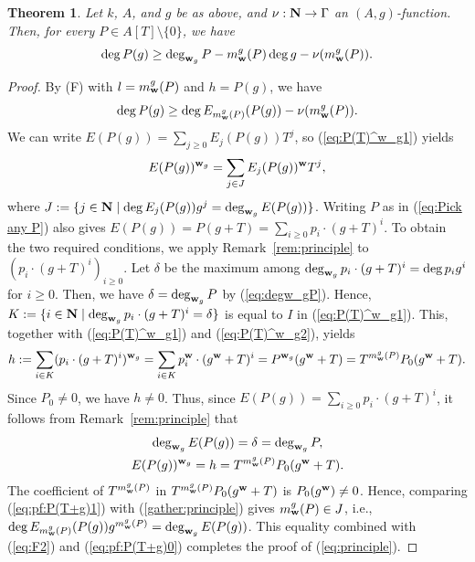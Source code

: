 \documentclass{amsart}
\theoremstyle{plain}
\newtheorem{thm}{Theorem}[section]
\theoremstyle{definition}
\newcommand{\zs}{\{ 0\} }
\newcommand{\sm}{\setminus}
\newcommand{\N}{{\bf N}}
\newcommand{\w}{{\bf w}}
\newcommand{\degw  }{\deg}
\begin{document}
\begin{thm}\label{thm:fundamental}
Let $k$, $A$, and $g$ be as above, 
and $\nu :\N \to \Gamma $ an $(A,g)$-function. 
Then, for every $P\in A[T]\sm \zs $, 
we have 
\begin{equation}\label{eq:principle}
\degw P(g)\ge \deg _{\w _g}P-m_{\w }^g(P)\degw g-\nu (m_{\w }^g(P)).
\end{equation}
\end{thm}
\begin{proof}
By (F) with $l=m_{\w }^g(P)$ and $h=P(g)$, 
we have 
\begin{equation}\label{eq:F2}
\degw P(g)\ge \degw E_{m_{\w }^g(P)}(P(g))-\nu (m_{\w }^g(P)). 
\end{equation}
We can write $E(P(g))=\sum _{j\ge 0}E_j(P(g))T^j$, 
so (\ref{eq:P(T)^w_g1}) yields 
\begin{equation}\label{gather:principle}
E(P(g))^{\w _g}=\sum _{j\in J}E_j(P(g))^{\w }T^j, 
\end{equation}
where $J:=\{ j\in \N \mid \degw E_j(P(g))g^j=\deg _{\w _g}E(P(g))\} $. 
Writing $P$ as in (\ref{eq:Pick any P}) also gives 
$E(P(g))=P(g+T)=\sum _{i\ge 0}p_i\cdot (g+T)^i$. 
To obtain the two required conditions, 
we apply Remark~\ref{rem:principle} to $(p_i\cdot (g+T)^i)_{i\ge 0}$. 
Let $\delta $ be the maximum among 
$\deg _{\w _g}p_i\cdot (g+T)^i=\degw p_ig^i$ for $i\ge 0$. 
Then, we have $\delta =\deg _{\w _g}P$ by (\ref{eq:degw_gP}). 
Hence, 
$K:=\{ i\in \N \mid \deg _{\w _g}p_i\cdot (g+T)^i=\delta \} $ 
is equal to $I$ in (\ref{eq:P(T)^w_g1}). 
This, 
together with (\ref{eq:P(T)^w_g1}) and (\ref{eq:P(T)^w_g2}), 
yields 
$$
h:=\sum _{i\in K}(p_i\cdot (g+T)^i)^{\w _g}
=\sum _{i\in K}p_i^{\w }\cdot (g^{\w }+T)^i
=P^{\w _g}(g^{\w }+T)=T^{m_{\w }^g(P)}P_0(g^{\w }+T). 
$$
Since $P_0\ne 0$, we have $h\ne 0$. 
Thus, 
since $E(P(g))=\sum _{i\ge 0}p_i\cdot (g+T)^i$, 
it follows from 
Remark~\ref{rem:principle} that 
\begin{gather}
\deg _{\w _g}E(P(g))=\delta =\deg _{\w _g}P, \label{eq:pf:P(T+g)0} \\
E(P(g))^{\w _g}=h=T^{m_{\w }^g(P)}P_0(g^{\w }+T). \label{eq:pf:P(T+g)1}
\end{gather}
The coefficient of $T^{m_{\w }^g(P)}$ in 
$T^{m_{\w }^g(P)}P_0(g^{\w }+T)$ is $P_0(g^{\w })\ne 0$. 
Hence, 
comparing (\ref{eq:pf:P(T+g)1}) with (\ref{gather:principle}) gives 
$m_{\w }^g(P)\in J$, 
i.e., 
$\degw E_{m_{\w }^g(P)}(P(g))g^{m_{\w }^g(P)}=\deg _{\w _g}E(P(g))$. 
This equality combined with 
(\ref{eq:F2}) and (\ref{eq:pf:P(T+g)0}) 
completes the proof of (\ref{eq:principle}). 
\end{proof}
\end{document}
